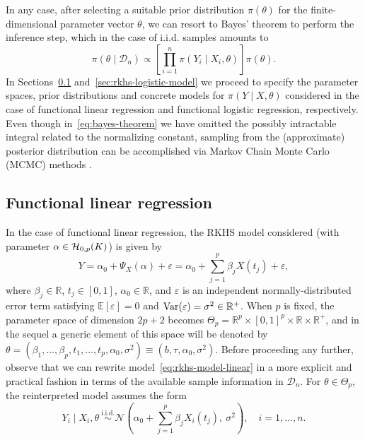 \documentclass[ba]{imsart}
\numberwithin{equation}{section}
\theoremstyle{plain}
\renewcommand{\epsilon}{\varepsilon}
\newcommand{\R}{\mathbb{R}}
\newcommand{\E}{\mathbb{E}}
\newcommand{\Hcal}{\ensuremath\mathcal{H}}
\newcommand{\Var}{\ensuremath\operatorname{Var}}
\begin{document}
In any case, after selecting a suitable prior distribution \(\pi(\theta)\) for the finite-dimensional parameter vector \(\theta\), we can resort to Bayes' theorem to perform the inference step, which in the case of i.i.d. samples amounts to
\begin{equation}\label{eq:bayes-theorem}
  \pi(\theta \mid \mathcal D_n) \propto \left[ \prod_{i=1}^n \pi(Y_i\mid X_i, \theta) \right]\pi(\theta).
\end{equation}
In Sections~\ref{sec:rkhs-linear-model} and~\ref{sec:rkhs-logistic-model} we proceed to specify the parameter spaces, prior distributions and concrete models for \(\pi(Y\mid X,\theta)\) considered in the case of functional linear regression and functional logistic regression, respectively. Even though in~\eqref{eq:bayes-theorem} we have omitted the possibly intractable integral related to the normalizing constant, sampling from the (approximate) posterior distribution can be accomplished via Markov Chain Monte Carlo (MCMC) methods \citep[e.g.][]{brooks2011handbook}.

\subsection{Functional linear regression}\label{sec:rkhs-linear-model}

In the case of functional linear regression, the RKHS model considered (with parameter \(\alpha\in \Hcal_{0,p}(K)\)) is given by
\begin{equation}\label{eq:rkhs-model-linear}
  Y = \alpha_0 + \Psi_X(\alpha) + \epsilon = \alpha_0 + \sum_{j=1}^p \beta_j X(t_j) + \epsilon,
\end{equation}
where \(\beta_j \in \R\), \(t_j \in [0, 1]\), \(\alpha_0\in\R\), and \(\epsilon\) is an independent normally-distributed error term satisfying \(\E[\epsilon]=0\) and \(\Var(\epsilon)=\sigma^2\in \R^+\). When \(p\) is fixed, the parameter space of dimension \(2p + 2\) becomes \(\Theta_p = \R^p \times [0, 1]^p \times \R \times \R^+\), and in the sequel a generic element of this space will be denoted by \(\theta = (\beta_1,\dots, \beta_p, t_1,\dots, t_p, \alpha_0, \sigma^2) \equiv (b, \tau, \alpha_0, \sigma^2)\). Before proceeding any further, observe that we can rewrite model~\eqref{eq:rkhs-model-linear} in a more explicit and practical fashion in terms of the available sample information in \(\mathcal D_n\). For \(\theta \in \Theta_p\), the reinterpreted model assumes the form
\begin{equation}\label{eq:rkhs-model-linear-2}
  Y_i \mid X_i, \theta \ \stackrel{\text{i.i.d.}}{\sim} \mathcal N\left(\alpha_0 + \sum_{j=1}^p \beta_j X_i(t_j), \ \sigma^2\right), \quad i =1,\dots, n.
\end{equation}
\end{document}
